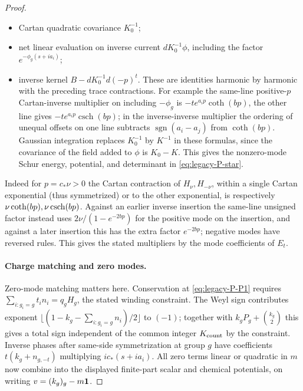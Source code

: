 \begin{proof}
\begin{itemize}

\item 

Cartan quadratic covariance \(K_0^{-1}\);

\item 

net linear evaluation on inverse current \(d K_0^{-1}\phi\), including the factor \(e^{-\phi_g(s+ia_i)}\);

\item 

inverse kernel \(B-d K_0^{-1}d(-p)^t\).
These are identities harmonic by harmonic with the preceding trace contractions. For example the same-line positive-\(p\) Cartan-inverse multiplier on including \(-\phi_g\) is \(-t e^{a_i p}\coth(bp)\), the other line gives \(-t e^{a_i p}\operatorname{csch}(bp)\); in the inverse-inverse multiplier the ordering of unequal offsets on one line subtracts \(\operatorname{sgn}(a_i-a_j)\) from \(\coth(bp)\). Gaussian integration replaces \(K_0^{-1}\) by \(K^{-1}\) in these formulas, since the covariance of the field added to \(\phi\) is \(K_0-K\). This gives the nonzero-mode Schur energy, potential, and determinant in \eqref{eq:legacy-P-star}.

\end{itemize}

Indeed for \(p=c_*\nu>0\) the Cartan contraction of \(H_\nu,H_{-\nu}\), within a single Cartan exponential (thus symmetrized) or to the other exponential, is respectively \(\nu\coth(bp),\nu\,{\rm csch}(bp)\). Against an earlier inverse insertion the same-line unsigned factor instead uses \(2\nu/(1-e^{-2bp})\) for the positive mode on the insertion, and against a later insertion this has the extra factor \(e^{-2bp}\); negative modes have reversed rules. This gives the stated multipliers by the mode coefficients of \(E_t\).

\paragraph{Charge matching and zero modes.}
Zero-mode matching matters here. Conservation at \eqref{eq:legacy-P-P1} requires \(\sum_{i:g_i=g}t_i n_i=q_g H_g\), the stated winding constraint. The Weyl sign contributes exponent \(\lfloor(1-k_g-\sum_{i:g_i=g}n_i)/2\rfloor\) to \((-1)\); together with \(k_gP_g+\binom{k_g}2\) this gives a total sign independent of the common integer \(K_{\rm count}\) by the constraint. Inverse phases after same-side symmetrization at group \(g\) have coefficients \(t(k_g+n_{g,-t})\) multiplying \(i c_*(s+i a_i)\). All zero terms linear or quadratic in \(m\) now combine into the displayed finite-part scalar and chemical potentials, on writing \(v=(k_g)_g-m{\bf1}\).


\end{proof}
